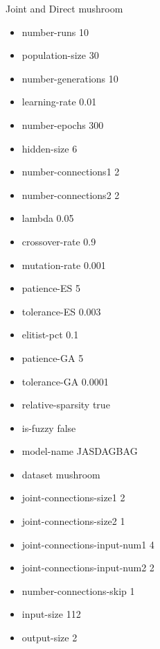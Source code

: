 Joint and Direct
mushroom
\begin{itemize}
\item number-runs 10
\item population-size 30
\item number-generations 10
\item learning-rate 0.01
\item number-epochs 300
\item hidden-size 6
\item number-connections1 2
\item number-connections2 2
\item lambda 0.05
\item crossover-rate 0.9
\item mutation-rate 0.001
\item patience-ES 5
\item tolerance-ES 0.003
\item elitist-pct 0.1
\item patience-GA 5
\item tolerance-GA 0.0001
\item relative-sparsity true
\item is-fuzzy false
\item model-name JASDAGBAG
\item dataset mushroom
\item joint-connections-size1 2
\item joint-connections-size2 1
\item joint-connections-input-num1 4
\item joint-connections-input-num2 2
\item number-connections-skip 1
\item input-size 112
\item output-size 2
\end{itemize}

